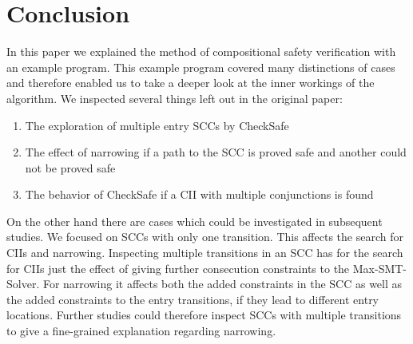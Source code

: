 \section{Conclusion}
\label{sec:conclusion}

In this paper we explained the method of compositional safety verification with an example program.
This example program covered many distinctions of cases and therefore enabled us to take a deeper look at the inner workings of the algorithm.
We inspected several things left out in the original paper:
\begin{enumerate}
\item The exploration of multiple entry SCCs by CheckSafe
\item The effect of narrowing if a path to the SCC is proved safe and another could not be proved safe
\item The behavior of CheckSafe if a CII with multiple conjunctions is found
\end{enumerate}

On the other hand there are cases which could be investigated in subsequent studies.
We focused on SCCs with only one transition.
This affects the search for CIIs and narrowing.
Inspecting multiple transitions in an SCC has for the search for CIIs just the effect of giving further consecution constraints to the Max-SMT-Solver.
For narrowing it affects both the added constraints in the SCC as well as the added constraints to the entry transitions, if they lead to different entry locations.
Further studies could therefore inspect SCCs with multiple transitions to give a fine-grained explanation regarding narrowing.
